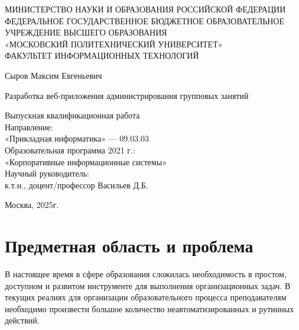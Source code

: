 \documentclass[14pt, timesnewroman]{article}
\begin{document}
\begin{titlepage} %
    \begin{center}
        МИНИСТЕРСТВО НАУКИ И ОБРАЗОВАНИЯ РОССИЙСКОЙ ФЕДЕРАЦИИ \\ 
        ФЕДЕРАЛЬНОЕ ГОСУДАРСТВЕННОЕ БЮДЖЕТНОЕ ОБРАЗОВАТЕЛЬНОЕ УЧРЕЖДЕНИЕ ВЫСШЕГО ОБРАЗОВАНИЯ \\
        «МОСКОВСКИЙ ПОЛИТЕХНИЧЕСКИЙ УНИВЕРСИТЕТ» \\
        \vspace{1cm}
        ФАКУЛЬТЕТ ИНФОРМАЦИОННЫХ ТЕХНОЛОГИЙ
        
        \vspace{2cm}

        \large{Сыров Максим Евгеньевич}
        \vspace{0.5cm}

        Разработка веб-приложения администрирования групповых занятий
        
        \vspace{1cm}
        Выпускная квалификационная работа 
        \vspace{0.5cm}\\
        Направление: \\
        «Прикладная информатика» — 09.03.03 \\
        Образовательная программа 2021 г.: \\
        «Корпоративные информационные системы»  \\
        \vspace{2cm}
        Научный руководитель: \\
        к.т.н., доцент/профессор Васильев Д.Б.
        \vspace{4cm}

        
        \large{Москва, 2025г.}
    \end{center}
\end{titlepage}

\newpage


\newpage
\section{Предметная область и проблема}

В настоящее время в сфере образования сложилась необходимость в простом, доступном и развитом инструменте для выполнения организационных задач. В текущих реалиях для организации образовательного процесса преподавателям необходимо произвести большое количество неавтоматизированных и рутинных действий.
\end{document}
